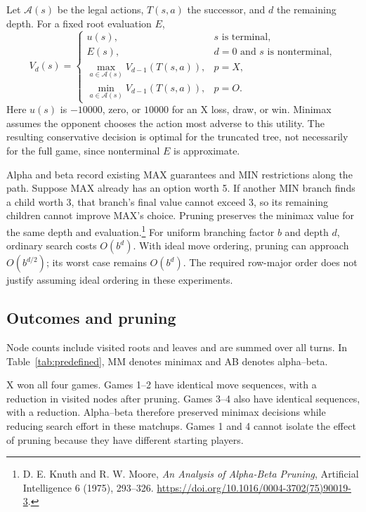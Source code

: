 \documentclass[UTF8,fontset=fandol,11pt,a4paper]{ctexart}
\begin{document}
Let $\mathcal A(s)$ be the legal actions, $T(s,a)$ the successor, and $d$ the
remaining depth. For a fixed root evaluation $E$,
\begin{equation}
V_d(s)=\begin{cases}
 u(s), & s\text{ is terminal},\\
 E(s), & d=0\text{ and }s\text{ is nonterminal},\\
 \max_{a\in\mathcal A(s)}V_{d-1}(T(s,a)), & p=X,\\
 \min_{a\in\mathcal A(s)}V_{d-1}(T(s,a)), & p=O.
\end{cases}
\end{equation}
Here $u(s)$ is $-10000$, zero, or $10000$ for an X loss, draw, or win.
Minimax assumes the opponent chooses the action most adverse to this
utility. The resulting conservative decision is optimal for the truncated
tree, not necessarily for the full game, since nonterminal $E$ is approximate.

Alpha and beta record existing MAX guarantees and MIN restrictions along
the path. Suppose MAX already has an option worth 5. If another MIN branch
finds a child worth 3, that branch's final value cannot exceed 3, so its
remaining children cannot improve MAX's choice. Pruning preserves the
minimax value for the same depth and evaluation.\footnote{D. E. Knuth and
R. W. Moore, \emph{An Analysis of Alpha-Beta Pruning}, Artificial Intelligence
6 (1975), 293--326. \url{https://doi.org/10.1016/0004-3702(75)90019-3}.}
For uniform branching factor $b$ and depth $d$, ordinary search costs
$O(b^d)$. With ideal move ordering, pruning can approach $O(b^{d/2})$;
its worst case remains $O(b^d)$. The required row-major order does not
justify assuming ideal ordering in these experiments.

\clearpage
\subsection{Outcomes and pruning}
Node counts include visited roots and leaves and are summed over all turns.
In Table~\ref{tab:predefined}, MM denotes minimax and AB denotes alpha--beta.

\begin{table}[htbp]
  \centering\small
  \caption{Results of the four required matchups.}\label{tab:predefined}
  
\end{table}

X won all four games. Games 1--2 have identical move sequences, with a
\PruningReductionA{} reduction in visited nodes after pruning. Games 3--4
also have identical sequences, with a \PruningReductionB{} reduction.
Alpha--beta therefore preserved minimax decisions while reducing search
effort in these matchups. Games 1 and 4 cannot isolate the effect of pruning
because they have different starting players.
\end{document}
